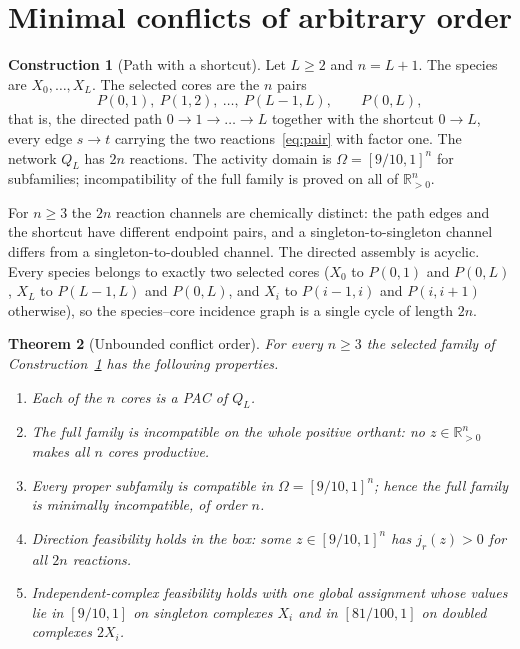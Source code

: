 \documentclass[11pt,a4paper]{article}
\theoremstyle{plain}
\newtheorem{theorem}{Theorem}[section]
\theoremstyle{definition}
\newtheorem{construction}[theorem]{Construction}
\theoremstyle{remark}
\newcommand{\R}{\mathbb{R}}
\newcommand{\Rpos}{\R_{>0}}
\begin{document}
\section{Minimal conflicts of arbitrary order}\label{sec:order}

\begin{construction}[Path with a shortcut]\label{con:shortcut}
Let $L\ge2$ and $n=L+1$. The species are $X_0,\dots,X_L$. The selected cores are the $n$ pairs
\[
P(0,1),\ P(1,2),\ \dots,\ P(L-1,L),\qquad P(0,L),
\]
that is, the directed path $0\to1\to\dots\to L$ together with the shortcut $0\to L$, every edge $s\to t$ carrying the two reactions~\eqref{eq:pair} with factor one. The network $Q_L$ has $2n$ reactions. The activity domain is $\Omega=[9/10,1]^n$ for subfamilies; incompatibility of the full family is proved on all of $\Rpos^n$.
\end{construction}

For $n\ge3$ the $2n$ reaction channels are chemically distinct: the path edges and the shortcut have different endpoint pairs, and a singleton-to-singleton channel differs from a singleton-to-doubled channel. The directed assembly is acyclic. Every species belongs to exactly two selected cores ($X_0$ to $P(0,1)$ and $P(0,L)$, $X_L$ to $P(L-1,L)$ and $P(0,L)$, and $X_i$ to $P(i-1,i)$ and $P(i,i+1)$ otherwise), so the species--core incidence graph is a single cycle of length $2n$.

\begin{theorem}[Unbounded conflict order]\label{thm:order}
For every $n\ge3$ the selected family of Construction~\ref{con:shortcut} has the following properties.
\begin{enumerate}[label=(\roman*)]
\item Each of the $n$ cores is a PAC of $Q_L$.
\item The full family is incompatible on the whole positive orthant: no $z\in\Rpos^{n}$ makes all $n$ cores productive.
\item Every proper subfamily is compatible in $\Omega=[9/10,1]^n$; hence the full family is minimally incompatible, of order $n$.
\item Direction feasibility holds in the box: some $z\in[9/10,1]^n$ has $j_r(z)>0$ for all $2n$ reactions.
\item Independent-complex feasibility holds with one global assignment whose values lie in $[9/10,1]$ on singleton complexes $X_i$ and in $[81/100,1]$ on doubled complexes $2X_i$.
\end{enumerate}
\end{theorem}
\end{document}

